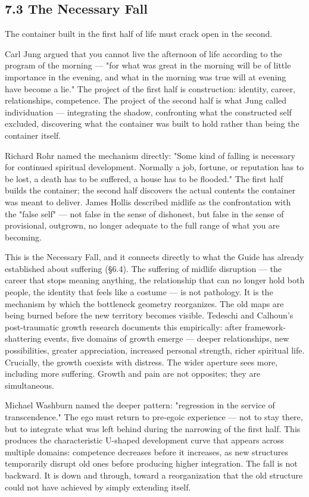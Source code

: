 \subsection*{7.3 The Necessary Fall}


The container built in the first half of life must crack open in the second.


Carl Jung argued that you cannot live the afternoon of life according to the program of the morning — "for what was great in the morning will be of little importance in the evening, and what in the morning was true will at evening have become a lie." The project of the first half is construction: identity, career, relationships, competence. The project of the second half is what Jung called individuation — integrating the shadow, confronting what the constructed self excluded, discovering what the container was built to hold rather than being the container itself.


Richard Rohr named the mechanism directly: "Some kind of falling is necessary for continued spiritual development. Normally a job, fortune, or reputation has to be lost, a death has to be suffered, a house has to be flooded." The first half builds the container; the second half discovers the actual contents the container was meant to deliver. James Hollis described midlife as the confrontation with the "false self" — not false in the sense of dishonest, but false in the sense of provisional, outgrown, no longer adequate to the full range of what you are becoming.


This is the Necessary Fall, and it connects directly to what the Guide has already established about suffering (§6.4). The suffering of midlife disruption — the career that stops meaning anything, the relationship that can no longer hold both people, the identity that feels like a costume — is not pathology. It is the mechanism by which the bottleneck geometry reorganizes. The old maps are being burned before the new territory becomes visible. Tedeschi and Calhoun's post-traumatic growth research documents this empirically: after framework-shattering events, five domains of growth emerge — deeper relationships, new possibilities, greater appreciation, increased personal strength, richer spiritual life. Crucially, the growth coexists with distress. The wider aperture sees more, including more suffering. Growth and pain are not opposites; they are simultaneous.


Michael Washburn named the deeper pattern: "regression in the service of transcendence." The ego must return to pre-egoic experience — not to stay there, but to integrate what was left behind during the narrowing of the first half. This produces the characteristic U-shaped development curve that appears across multiple domains: competence decreases before it increases, as new structures temporarily disrupt old ones before producing higher integration. The fall is not backward. It is down and through, toward a reorganization that the old structure could not have achieved by simply extending itself.



